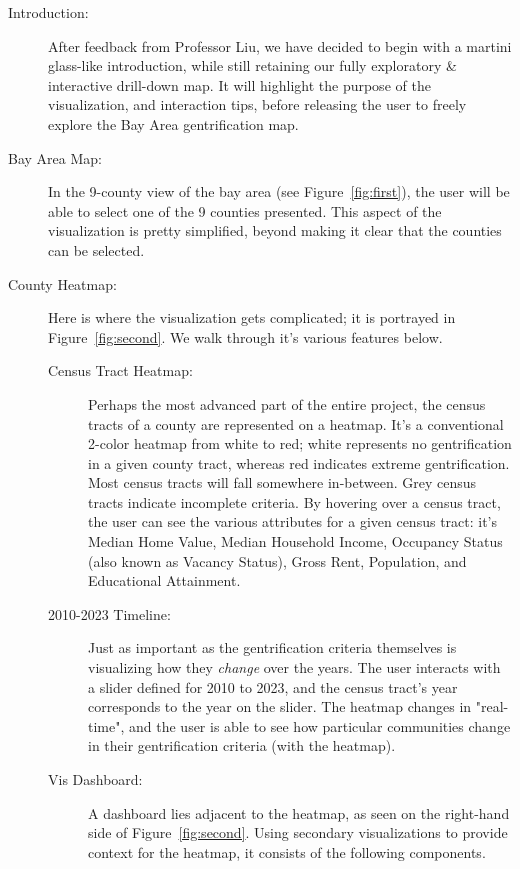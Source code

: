 \documentclass{article}
\begin{document}
\begin{description}

    \item[Introduction:] After feedback from Professor Liu, we have decided to begin with a martini glass-like introduction, while still retaining our fully exploratory \& interactive drill-down map. It will highlight the purpose of the visualization, and interaction tips, before releasing the user to freely explore the Bay Area gentrification map.
    
    \item[Bay Area Map:] In the 9-county view of the bay area (see Figure~\ref{fig:first}), the user will be able to select one of the 9 counties presented. This aspect of the visualization is pretty simplified, beyond making it clear that the counties can be selected.
    
    \item[County Heatmap:] Here is where the visualization gets complicated; it is portrayed in Figure~\ref{fig:second}. We walk through it's various features below.
    
    \begin{description}
    
        \item[Census Tract Heatmap:] Perhaps the most advanced part of the entire project, the census tracts of a county are represented on a heatmap. It's a conventional 2-color heatmap from white to red; white represents no gentrification in a given county tract, whereas red indicates extreme gentrification. Most census tracts will fall somewhere in-between. Grey census tracts indicate incomplete criteria. By hovering over a census tract, the user can see the various attributes for a given census tract: it's Median Home Value, Median Household Income, Occupancy Status (also known as Vacancy Status), Gross Rent, Population, and Educational Attainment.  
        
        \item[2010-2023 Timeline:] Just as important as the gentrification criteria themselves is visualizing how they \textit{change} over the years. The user interacts with a slider defined for 2010 to 2023, and the census tract's year corresponds to the year on the slider. The heatmap changes in "real-time", and the user is able to see how particular communities change in their gentrification criteria (with the heatmap).
        
        \item[Vis Dashboard:] A dashboard lies adjacent to the heatmap, as seen on the right-hand side of Figure~\ref{fig:second}. Using secondary visualizations to provide context for the heatmap, it consists of the following components.
        

\end{description}
\end{description}
\end{document}
